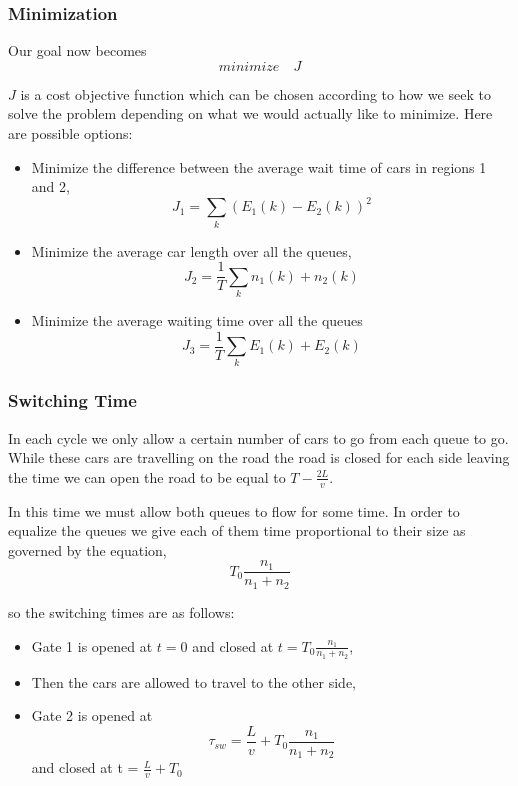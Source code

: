 \documentclass[a4paper]{article}
\begin{document}
\subsubsection{Minimization}

Our goal now becomes
\[minimize \quad J\]

$J$ is a cost objective function which can be chosen according to how we seek to solve the problem depending on what we would actually like to minimize. Here are possible options:
\begin{itemize}
\item Minimize the difference between the average wait time of cars in regions 1 and 2,
 \[J_1 = \sum_k (E_1(k) - E_2(k))^2\]
 
\item Minimize the average car length over all the queues,
\[J_2 = \frac{1}{T} \sum_k n_1(k)+n_2 (k)\]

\item Minimize the average waiting time over all the queues
\[J_3 = \frac{1}{T}\sum_k E_1(k)+E_2(k)\]
\end{itemize}

\subsubsection{Switching Time}

In each cycle we only allow a certain number of cars to go from each queue to go. While these cars are travelling on the road the road is closed for each side leaving the time we can open the road to be equal to $T -\frac{2L}{v}$.

In this time we must allow both queues to flow for some time. In order to equalize the queues we give each of them time proportional to their size as governed by the equation,
\begin{equation}
T_0 \frac{n_1}{n_1 +n_2}
\end{equation}

so the switching times are as follows:
\begin{itemize}
\item Gate 1 is opened at $t = 0$ and closed at $t = T_0\frac{n_1}{n_1 + n_2}$,
\item Then the cars are allowed to travel to the other side,
\item Gate 2 is opened at 
\[\tau_{sw} = \frac{L}{v} + T_0\frac{n_1}{n_1 + n_2}\]
and closed at t = $\frac{L}{v} + T_0$
\end{itemize}
\end{document}
